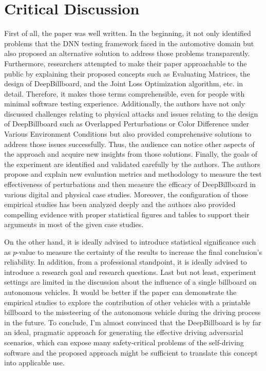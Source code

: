\documentclass[10pt,a4paper]{report}
\begin{document}
\section{Critical Discussion}
First of all, the paper was well written. In the beginning, it not only identified problems that the DNN testing framework faced in the automotive domain but also proposed an alternative solution to address those problems transparently.
%
Furthermore, researchers attempted to make their paper approachable to the public by explaining their proposed concepts such as Evaluating Matrices, the design of DeepBillboard, and the Joint Loss Optimization algorithm, etc. in detail. 
%
Therefore, it makes those terms comprehensible, even for people with minimal software testing experience.
%
Additionally, the authors have not only discussed challenges relating to physical attacks and issues relating to the design of DeepBillboard such as Overlapped Perturbations or Color Difference under Various Environment Conditions but also provided comprehensive solutions to address those issues successfully.
%
Thus, the audience can notice other aspects of the approach and acquire new insights from those solutions.
%
Finally, the goals of the experiment are identified and validated carefully by the authors.
%
The authors propose and explain new evaluation metrics and methodology to measure the test effectiveness of perturbations and then measure the efficacy of DeepBillboard in various digital and physical case studies.
%
Moreover, the configuration of those empirical studies has been analyzed deeply and the authors also provided compelling evidence with proper statistical figures and tables to support their arguments in most of the given case studies.
%

On the other hand, it is ideally advised to introduce statistical significance such as $p$-value to measure the certainty of the results to increase the final conclusion's reliability.
%
In addition, from a professional standpoint, it is ideally advised to introduce a research goal and research questions.
%
Last but not least, experiment settings are limited in the discussion about the influence of a single billboard on autonomous vehicles.
%
It would be better if the paper can demonstrate the empirical studies to explore the contribution of other vehicles with a printable billboard to the missteering of the autonomous vehicle during the driving process in the future.
%
To conclude, I’m almost convinced that the DeepBillboard is by far an ideal, pragmatic approach for generating the effective driving adversarial scenarios, which can expose many safety-critical problems of the self-driving software and the proposed approach might be sufficient to translate this concept into applicable use.
\end{document}
